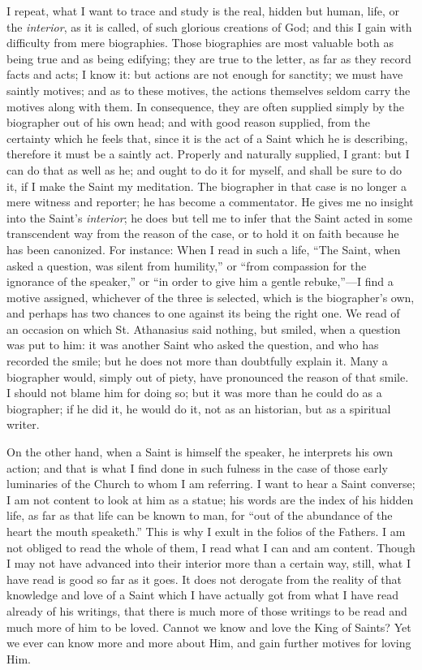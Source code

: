 I repeat, what I want to trace and study is the real, hidden but
human, life, or the \emph{interior}, as it is called, of such glorious
creations of God; and this I gain with difficulty from mere
biographies. Those biographies are most valuable both as being true
and as being edifying; they are true to the letter, as far as they
record facts and acts; I know it: but actions are not enough for
sanctity; we must have saintly motives; and as to these motives, the
actions themselves seldom carry the motives along with them. In
consequence, they are often supplied simply by the biographer out of
his own head; and with good reason supplied, from the certainty
which he feels that, since it is the act of a Saint which he is
describing, therefore it must be a saintly act. Properly and naturally
supplied, I grant: but I can do that as well as he; and ought to do it
for myself, and shall be sure to do it, if I make the Saint my
meditation. The biographer in that case is no longer a mere witness
and reporter; he has become a commentator. He gives me no insight into
the Saint's \emph{interior}; he does but tell me to infer that the
Saint acted in some transcendent way from the reason of the case, or
to hold it on faith because he has been canonized. For instance: When
I read in such a life, ``The Saint, when asked a question, was
silent from humility,'' or ``from compassion for the ignorance
of the speaker,'' or ``in order to give him a gentle
rebuke,''—I find a motive assigned, whichever of the three is
selected, which is the biographer's own, and perhaps has two chances
to one against its being the right one. We read of an occasion on
which St. Athanasius said nothing, but smiled, when a question was put
to him: it was another Saint who asked the question, and who has
recorded the smile; but he does not more than doubtfully explain it.
Many a biographer would, simply out of piety, have pronounced the
reason of that smile. I should not blame him for doing so; but it was
more than he could do as a biographer; if he did it, he would do it,
not as an historian, but as a spiritual writer.

On the other hand, when a Saint is himself the speaker, he
interprets his own action; and that is what I find done in such
fulness in the case of those early luminaries of the Church to whom I
am referring. I want to hear a Saint converse; I am not content to
look at him as a statue; his words are the index of his hidden life,
as far as that life can be known to man, for ``out of the
abundance of the heart the mouth speaketh.'' This is why I
exult in the folios of the Fathers. I am not obliged to read the whole
of them, I read what I can and am content. Though I may not have
advanced into their interior more than a certain way, still, what I
have read is good so far as it goes. It does not derogate from the
reality of that knowledge and love of a Saint which I have actually
got from what I have read already of his writings, that there is much
more of those writings to be read and much more of him to be loved.
Cannot we know and love the King of Saints? Yet we ever can know more
and more about Him, and gain further motives for loving Him.


